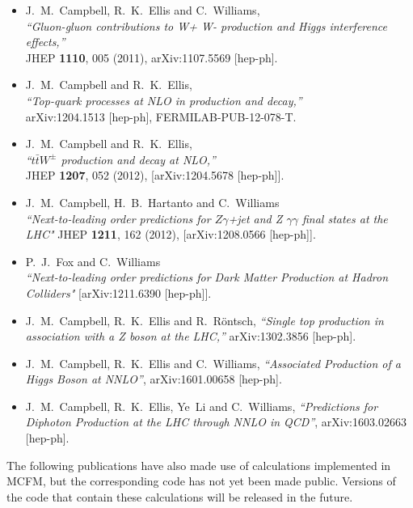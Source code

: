 \documentclass[12pt]{article}
\begin{document}
\begin{itemize}
  {\it ``NLO QCD predictions for $W+1$ jet and $W+2$ jet production with at least one b jet at the 7 TeV LHC,''} \\
    arXiv:1107.3714 [hep-ph].
\item J.~M.~Campbell, R.~K.~Ellis and C.~Williams, \\
  {\it ``Gluon-gluon contributions to W+ W- production and Higgs interference effects,''} \\
  JHEP {\bf 1110}, 005 (2011),
  arXiv:1107.5569 [hep-ph].
\item J.~M.~Campbell and R.~K.~Ellis, \\
  {\it ``Top-quark processes at NLO in production and decay,''} \\
  arXiv:1204.1513 [hep-ph], FERMILAB-PUB-12-078-T.
\item J.~M.~Campbell and R.~K.~Ellis, \\
  {\it ``$t \bar{t} W^{\pm}$ production and decay at NLO,''} \\
  JHEP {\bf 1207}, 052 (2012), [arXiv:1204.5678 [hep-ph]].
\item
 J.~M.~Campbell, H.~B.~Hartanto and C.~Williams\\
  {\it {``Next-to-leading order predictions for $Z \gamma$+jet and
          Z $\gamma \gamma$ final states at the LHC"}}
   JHEP {\bf 1211}, 162 (2012), [arXiv:1208.0566 [hep-ph]].	
\item
 P.~J.~Fox  and C.~Williams\\
      {\it {``Next-to-leading order predictions for Dark Matter Production at Hadron Colliders"}}
                        	 [arXiv:1211.6390 [hep-ph]].	 
\item
  J.~M.~Campbell, R.~K.~Ellis and R.~R{\"o}ntsch,
  {\it ``Single top production in association with a Z boson at the LHC,''}
  arXiv:1302.3856 [hep-ph].

\item
 J.~M.~Campbell, R.~K.~Ellis and C.~Williams,
 {\it ``Associated Production of a Higgs Boson at NNLO''},
  arXiv:1601.00658 [hep-ph].
  
\item 
 J.~M.~Campbell, R.~K.~Ellis, Ye~Li and C.~Williams,
  {\it ``Predictions for Diphoton Production at the LHC through NNLO in QCD''},
  arXiv:1603.02663 [hep-ph].  
\end{itemize}

The following publications have also made use of calculations
implemented in MCFM, but the corresponding code has not yet been made
public. Versions of the code that contain these calculations will be
released in the future.
\end{document}
